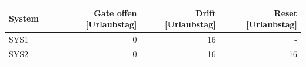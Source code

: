 \begin{tabular}{lrrr}
\toprule
System & Gate offen [Urlaubstag] & Drift [Urlaubstag] & Reset [Urlaubstag] \\
\midrule
SYS1 & 0 & 16 & - \\
SYS2 & 0 & 16 & 16 \\
\bottomrule
\end{tabular}

